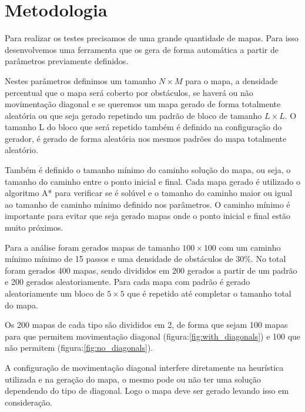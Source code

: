  \chapter[Metodologia]{Metodologia}
 
Para realizar os testes precisamos de uma grande quantidade de mapas. Para isso desenvolvemos uma ferramenta que os gera de forma automática a partir de parâmetros previamente definidos.
 
Nestes parâmetros definimos um tamanho $N\times M$ para o mapa, a densidade percentual que o mapa será coberto por obstáculos, se haverá ou não movimentação diagonal e se queremos um mapa gerado de forma totalmente aleatória ou que seja gerado repetindo um padrão de bloco de tamanho $L\times L$.  
O tamanho L do bloco que será repetido também é definido na configuração do gerador, é gerado de forma aleatória nos mesmos padrões do mapa totalmente aleatório. 
 
Também é definido o tamanho mínimo do caminho solução do mapa, ou seja, o tamanho do caminho entre o ponto inicial e final.
Cada mapa gerado é utilizado o algoritmo A* para verificar se é solúvel e o tamanho do caminho maior ou igual ao tamanho de caminho mínimo  definido nos parâmetros. O caminho mínimo é importante para evitar que seja gerado mapas onde o ponto inicial e final estão muito próximos.
 
Para a análise foram gerados mapas de tamanho  $100\times 100$  com um caminho mínimo mínimo de 15 passos e uma densidade de obstáculos de 30\%.
No total foram gerados 400 mapas, sendo divididos em 200 gerados a partir de um padrão e 200 gerados aleatoriamente. Para cada mapa com padrão é gerado aleatoriamente um bloco de $5\times 5$ que é repetido até completar o tamanho total do mapa.
 
Os 200 mapas de cada tipo são divididos em 2, de forma que sejam 100 mapas para que permitem movimentação diagonal (figura:\ref{fig:with_diagonals}) e 100 que não permitem (figura:\ref{fig:no_diagonals}).
 
A configuração de movimentação diagonal interfere diretamente na heurística utilizada e na geração do mapa, o mesmo pode ou não ter uma solução dependendo do tipo de diagonal. Logo o mapa deve ser gerado levando isso em consideração.
 
